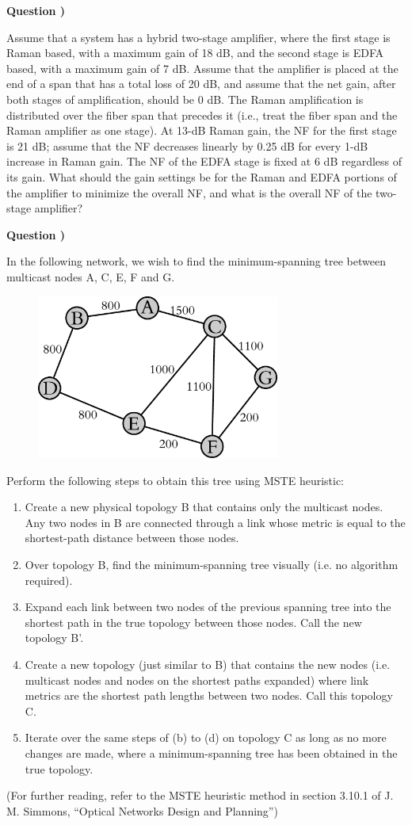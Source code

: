 \documentclass[10pt,letterpaper]{article}
\newcounter{QuestionNumber}
\newcommand{\Q}{
\textbf{Question \theQuestionNumber)}
\stepcounter{QuestionNumber}
}
\begin{document}
\Q

Assume that a system has a hybrid two-stage amplifier, where the first stage is
Raman based, with a maximum gain of 18 dB, and the second stage is EDFA
based, with a maximum gain of 7 dB. Assume that the amplifier is placed at
the end of a span that has a total loss of 20 dB, and assume that the net gain,
after both stages of amplification, should be 0 dB. The Raman amplification
is distributed over the fiber span that precedes it (i.e., treat the fiber span and
the Raman amplifier as one stage). At 13-dB Raman gain, the NF for the first
stage is 21 dB; assume that the NF decreases linearly by 0.25 dB for every
1-dB increase in Raman gain. The NF of the EDFA stage is fixed at 6 dB regardless
of its gain. What should the gain settings be for the Raman and EDFA
portions of the amplifier to minimize the overall NF, and what is the overall
NF of the two-stage amplifier?

\Q

In the following network, we wish to find the minimum-spanning tree between multicast nodes A, C, E, F and G.
\begin{figure}[h]
\centering
\includegraphics[width=80mm]{steiner}
\end{figure}

Perform the following steps to obtain this tree using MSTE heuristic:
\begin{enumerate}[label=\alph*-]
\item
Create a new physical topology B that contains only the multicast nodes. Any two nodes in B are connected through a link whose metric is equal to the shortest-path distance between those nodes.
\item
Over topology B, find the minimum-spanning tree visually (i.e. no algorithm required).
\item
Expand each link between two nodes of the previous spanning tree into the shortest path in the true topology between those nodes. Call the new topology B'.
\item
Create a new topology (just similar to B) that contains the new nodes (i.e. multicast nodes and nodes on the shortest paths expanded) where link metrics are the shortest path lengths between two nodes. Call this topology C.
\item
Iterate over the same steps of (b) to (d) on topology C as long as no more changes are made, where a minimum-spanning tree has been obtained in the true topology.
\end{enumerate}
(For further reading, refer to the MSTE heuristic method in section 3.10.1 of J. M. Simmons, ``Optical Networks Design and Planning'')
\end{document}
